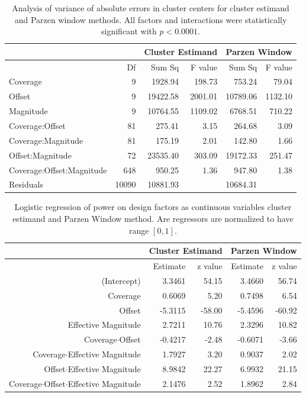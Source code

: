 \begin{table}
\centering
\caption{Analysis of variance of absolute errors in cluster centers for cluster estimand and Parzen window methods. All factors and interactions were statistically significant with $p<0.0001$.
\label{nucleosomes:tab:clusterAnova}}
\begin{tabular}{lr|rr|rr}
\hline 
 &  & \multicolumn{2}{c|}{Cluster Estimand} & \multicolumn{2}{c}{Parzen Window}\tabularnewline
\hline 
 & Df  & Sum Sq  & F value  & Sum Sq  & F value \tabularnewline
\hline 
Coverage & 9  & 1928.94  & 198.73  & 753.24  & 79.04 \tabularnewline
Offset  & 9  & 19422.58  & 2001.01  & 10789.06  & 1132.10 \tabularnewline
Magnitude  & 9  & 10764.55  & 1109.02 & 6768.51  & 710.22 \tabularnewline
Coverage:Offset  & 81  & 275.41  & 3.15 & 264.68  & 3.09 \tabularnewline
Coverage:Magnitude  & 81  & 175.19  & 2.01 & 142.80  & 1.66 \tabularnewline
Offset:Magnitude  & 72  & 23535.40  & 303.09 & 19172.33  & 251.47 \tabularnewline
Coverage:Offset:Magnitude  & 648  & 950.25  & 1.36  & 947.80  & 1.38 \tabularnewline
Residuals  & 10090  & 10881.93  &  & 10684.31  & \tabularnewline
\hline 
\end{tabular}
\end{table}
%
\begin{table}
\centering
\caption{Logistic regression of power on design factors as continuous variables cluster estimand and Parzen Window method.
Are regressors are normalized to have range $[0,1]$.
\label{nucleosomes:tab:clusterGlm}}
\begin{tabular}{r|rr|rr}
\hline 
 & \multicolumn{2}{c|}{Cluster Estimand} & \multicolumn{2}{c}{Parzen Window}\tabularnewline
\hline 
 & Estimate  & z value  & Estimate  & z value \tabularnewline
\hline 
(Intercept)  & 3.3461  & 54.15  & 3.4660  & 56.74 \tabularnewline
Coverage & 0.6069  & 5.20  & 0.7498  & 6.54 \tabularnewline
Offset  & -5.3115  & -58.00  & -5.4596  & -60.92 \tabularnewline
Effective Magnitude  & 2.7211  & 10.76  & 2.3296  & 10.82 \tabularnewline
Coverage$\cdot$Offset  & -0.4217  & -2.48  & -0.6071  & -3.66 \tabularnewline
Coverage$\cdot$Effective Magnitude  & 1.7927  & 3.20  & 0.9037  & 2.02 \tabularnewline
Offset$\cdot$Effective Magnitude  & 8.9842  & 22.27  & 6.9932  & 21.15 \tabularnewline
Coverage$\cdot$Offset$\cdot$Effective Magnitude  & 2.1476  & 2.52  & 1.8962  & 2.84 \tabularnewline
\hline 
\end{tabular}
\end{table}

